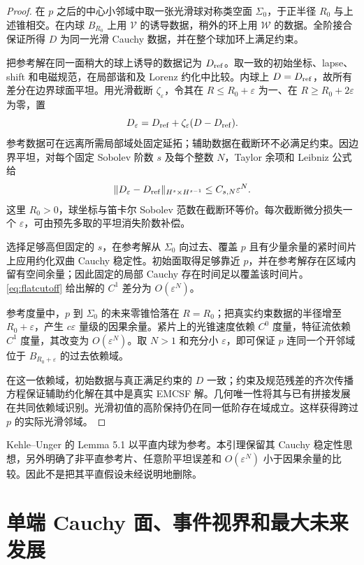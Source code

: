 \begin{proof}
在 $p$ 之后的中心小邻域中取一张光滑球对称类空面 $\Sigma_0$，于正半径 $R_0$ 与上述锥相交。在内球 $B_{R_0}$ 上用 $\mathcal V$ 的诱导数据，稍外的环上用 $\mathcal W$ 的数据。全阶接合保证所得 $D$ 为同一光滑 Cauchy 数据，并在整个球加环上满足约束。

把参考解在同一面稍大的球上诱导的数据记为 $D_{\rm ref}$。取一致的初始坐标、lapse、shift 和电磁规范，在局部谐和及 Lorenz 约化中比较。内球上 $D=D_{\rm ref}$，故所有差分在边界球面平坦。用光滑截断 $\zeta_\varepsilon$，令其在 $R\le R_0+\varepsilon$ 为一、在 $R\ge R_0+2\varepsilon$ 为零，置
\[
D_\varepsilon=D_{\rm ref}+\zeta_\varepsilon(D-D_{\rm ref}).
\]
参考数据可在远离所需局部域处固定延拓；辅助数据在截断环不必满足约束。因边界平坦，对每个固定 Sobolev 阶数 $s$ 及每个整数 $N$，Taylor 余项和 Leibniz 公式给
\begin{equation}\label{eq:flatcutoff}
\|D_\varepsilon-D_{\rm ref}\|_{H^s\times H^{s-1}}
\le C_{s,N}\varepsilon^N.
\end{equation}
这里 $R_0>0$，球坐标与笛卡尔 Sobolev 范数在截断环等价。每次截断微分损失一个 $\varepsilon$，可由预先多取的平坦消失阶数补偿。

选择足够高但固定的 $s$，在参考解从 $\Sigma_0$ 向过去、覆盖 $p$ 且有少量余量的紧时间片上应用约化双曲 Cauchy 稳定性。初始面取得足够靠近 $p$，并在参考解存在区域内留有空间余量；因此固定的局部 Cauchy 存在时间足以覆盖该时间片。\eqref{eq:flatcutoff} 给出解的 $C^1$ 差分为 $O(\varepsilon^N)$。

参考度量中，$p$ 到 $\Sigma_0$ 的未来零锥恰落在 $R=R_0$；把真实约束数据的半径增至 $R_0+\varepsilon$，产生 $c\varepsilon$ 量级的因果余量。紧片上的光锥速度依赖 $C^0$ 度量，特征流依赖 $C^1$ 度量，其改变为 $O(\varepsilon^N)$。取 $N>1$ 和充分小 $\varepsilon$，即可保证 $p$ 连同一个开邻域位于 $B_{R_0+\varepsilon}$ 的过去依赖域。

在这一依赖域，初始数据与真正满足约束的 $D$ 一致；约束及规范残差的齐次传播方程保证辅助约化解在其中是真实 EMCSF 解。几何唯一性将其与已有拼接发展在共同依赖域识别。光滑初值的高阶保持仍在同一低阶存在域成立。这样获得跨过 $p$ 的实际光滑邻域。\qedhere
\end{proof}

Kehle--Unger 的 Lemma 5.1 以平直内球为参考。本引理保留其 Cauchy 稳定性思想，另外明确了非平直参考片、任意阶平坦误差和 $O(\varepsilon^N)$ 小于因果余量的比较。因此不是把其平直假设未经说明地删除。

\section{单端 Cauchy 面、事件视界和最大未来发展}

